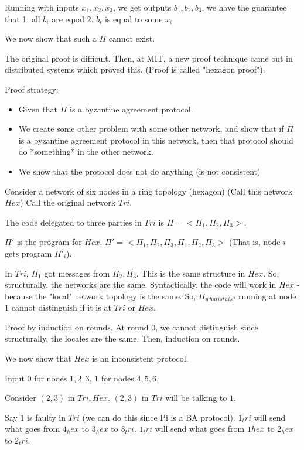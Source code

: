 Running with inputs $x_1, x_2, x_3$, we get outputs $b_1, b_2, b_3$, we have the guarantee that
1. all $b_i$ are equal
2. $b_i$ is equal to some $x_i$


We now show that such a $\Pi$ cannot exist.

The original proof is difficult. Then, at MIT, a new proof technique came out in distributed systems
which proved this. (Proof is called "hexagon proof"). 

Proof strategy:
\begin{itemize}
    \item Given that $\Pi$ is a byzantine agreement protocol.
    \item We create some other problem with some other network, and show that if $\Pi$ is a byzantine
        agreement protocol in this network, then that protocol should do *something* in the other network.
    \item We show that the protocol does not do anything (is not consistent)
\end{itemize}


Consider a network of six nodes in a ring topology (hexagon) (Call this network $Hex$)
Call the original network $Tri$.

The code delegated to three parties in $Tri$ is $\Pi = < \Pi_1, \Pi_2, \Pi_3>$.

$\Pi'$ is the program for $Hex$.  $\Pi' = <\Pi_1, \Pi_2, \Pi_3, \Pi_1, \Pi_2, \Pi_3>$
(That is, node $i$ gets program $\Pi'_i$).


In $Tri$, $\Pi_1$ got messages from $\Pi_2 , \Pi_3$. This is
the same structure in $Hex$. So, structurally, the networks are the same.
Syntactically, the code will work in $Hex$ - because the
"local" network topology is the same. So, $\Pi_{what is this?}$ running at node $1$ cannot 
distinguish if it is at $Tri$ or $Hex$.

Proof by induction on rounds. At round $0$, we cannot distinguish since
structurally, the locales are the same. Then, induction on rounds.

We now show that $Hex$ is an inconsistent protocol.

Input $0$ for nodes $1, 2, 3$, $1$ for nodes $4, 5, 6$.


Consider $(2, 3)$ in $Tri, Hex$. $(2, 3)$ in $Tri$ will be talking to $1$.

Say $1$ is faulty in $Tri$ (we can do this since Pi is a BA protocol).
$1_tri$  will send what goes from $4_hex$ to $3_hex$ to $3_tri$.
$1_tri$  will send what goes from $1hex$ to $2_hex$ to $2_tri$.

